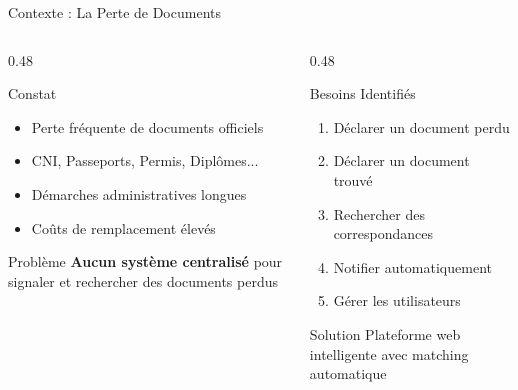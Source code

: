 \documentclass[aspectratio=169]{beamer}
\begin{document}
\begin{frame}{Contexte : La Perte de Documents}
    \begin{columns}[T]
        \begin{column}{0.48\textwidth}
            \begin{block}{Constat}
                \begin{itemize}
                    \item Perte fréquente de documents officiels
                    \item CNI, Passeports, Permis, Diplômes...
                    \item Démarches administratives longues
                    \item Coûts de remplacement élevés
                \end{itemize}
            \end{block}

            \vspace{0.3cm}

            \begin{alertblock}{Problème}
                \textbf{Aucun système centralisé} pour signaler et rechercher des documents perdus
            \end{alertblock}
        \end{column}
        \begin{column}{0.48\textwidth}
            \begin{block}{Besoins Identifiés}
                \begin{enumerate}
                    \item Déclarer un document perdu
                    \item Déclarer un document trouvé
                    \item Rechercher des correspondances
                    \item Notifier automatiquement
                    \item Gérer les utilisateurs
                \end{enumerate}
            \end{block}

            \vspace{0.3cm}

            \begin{exampleblock}{Solution}
                Plateforme web intelligente avec matching automatique
            \end{exampleblock}
        \end{column}
    \end{columns}
\end{frame}
\end{document}
